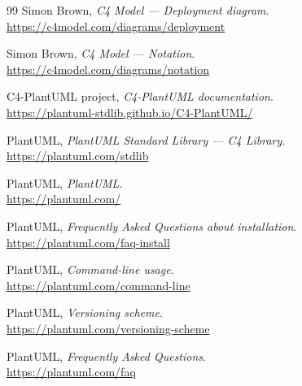 \documentclass[11pt]{article}
\begin{document}
\begin{thebibliography}{99}
Simon Brown, \emph{C4 Model --- Deployment diagram}.\\
\url{https://c4model.com/diagrams/deployment}

Simon Brown, \emph{C4 Model --- Notation}.\\
\url{https://c4model.com/diagrams/notation}

C4-PlantUML project, \emph{C4-PlantUML documentation}.\\
\url{https://plantuml-stdlib.github.io/C4-PlantUML/}

PlantUML, \emph{PlantUML Standard Library --- C4 Library}.\\
\url{https://plantuml.com/stdlib}

PlantUML, \emph{PlantUML}.\\
\url{https://plantuml.com/}

PlantUML, \emph{Frequently Asked Questions about installation}.\\
\url{https://plantuml.com/faq-install}

PlantUML, \emph{Command-line usage}.\\
\url{https://plantuml.com/command-line}

PlantUML, \emph{Versioning scheme}.\\
\url{https://plantuml.com/versioning-scheme}

PlantUML, \emph{Frequently Asked Questions}.\\
\url{https://plantuml.com/faq}

\end{thebibliography}
\end{document}
